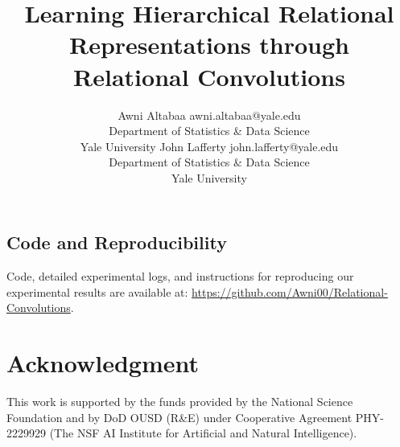 \documentclass[10pt]{article}
\title{Learning Hierarchical Relational Representations through \\ Relational Convolutions}
\author{\name Awni Altabaa \email awni.altabaa@yale.edu \\
      \addr Department of Statistics \& Data Science\\
      Yale University
      \AND
      \name John Lafferty \email john.lafferty@yale.edu \\
      \addr Department of Statistics \& Data Science\\
      Yale University
    }
\begin{document}
\maketitle









% 






\subsection*{Code and Reproducibility}
Code, detailed experimental logs, and instructions for reproducing our experimental results are available at: \url{https://github.com/Awni00/Relational-Convolutions}.

\section*{Acknowledgment}
This work is supported by the funds provided by the National Science Foundation and by DoD OUSD (R\&E) under Cooperative Agreement PHY-2229929 (The NSF AI Institute for Artificial and Natural Intelligence).

\printbibliography
% 
% 
% 
% 

\clearpage
\newpage
\appendix


\clearpage\newpage

\clearpage\newpage

\clearpage\newpage

\end{document}
